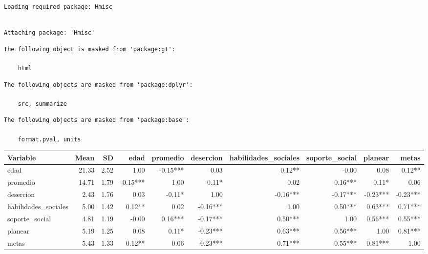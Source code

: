 \documentclass[
  letterpaper,
  DIV=11,
  numbers=noendperiod]{scrartcl}
\begin{document}
\begin{verbatim}
Loading required package: Hmisc
\end{verbatim}

\begin{verbatim}

Attaching package: 'Hmisc'
\end{verbatim}

\begin{verbatim}
The following object is masked from 'package:gt':

    html
\end{verbatim}

\begin{verbatim}
The following objects are masked from 'package:dplyr':

    src, summarize
\end{verbatim}

\begin{verbatim}
The following objects are masked from 'package:base':

    format.pval, units
\end{verbatim}

\begin{table}
\fontsize{12.0pt}{14.4pt}\selectfont
\begin{tabular*}{\linewidth}{@{\extracolsep{\fill}}lrrrrrrrrr}
\toprule
Variable & Mean & SD & edad & promedio & desercion & habilidades\_sociales & soporte\_social & planear & metas \\ 
\midrule\addlinespace[2.5pt]
edad & 21.33 & 2.52 & 1.00 & -0.15*** & 0.03 & 0.12** & -0.00 & 0.08 & 0.12** \\ 
promedio & 14.71 & 1.79 & -0.15*** & 1.00 & -0.11* & 0.02 & 0.16*** & 0.11* & 0.06 \\ 
desercion & 2.43 & 1.76 & 0.03 & -0.11* & 1.00 & -0.16*** & -0.17*** & -0.23*** & -0.23*** \\ 
habilidades\_sociales & 5.00 & 1.42 & 0.12** & 0.02 & -0.16*** & 1.00 & 0.50*** & 0.63*** & 0.71*** \\ 
soporte\_social & 4.81 & 1.19 & -0.00 & 0.16*** & -0.17*** & 0.50*** & 1.00 & 0.56*** & 0.55*** \\ 
planear & 5.19 & 1.25 & 0.08 & 0.11* & -0.23*** & 0.63*** & 0.56*** & 1.00 & 0.81*** \\ 
metas & 5.43 & 1.33 & 0.12** & 0.06 & -0.23*** & 0.71*** & 0.55*** & 0.81*** & 1.00 \\ 
\bottomrule
\end{tabular*}
\end{table}
\end{document}
